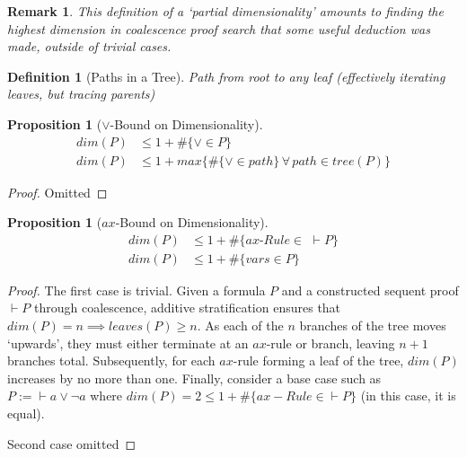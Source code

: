 \documentclass{article}
\def\seteq{:=}
\theoremstyle{indented}
\newtheorem{definition}[sec-ctr]{Definition}
\newtheorem{proposition}[sec-ctr]{Proposition}
\newtheorem*{remark*}{Remark}
\begin{document}
        \begin{remark*}
            This definition of a `partial dimensionality' amounts to finding the highest dimension in coalescence proof search that some useful deduction was made, outside of trivial cases.
        \end{remark*}


        \begin{definition}[Paths in a Tree]
            Path from root to any leaf (effectively iterating leaves, but tracing parents)
        \end{definition}


        \begin{proposition}[$\vee$-Bound on Dimensionality]
            \begin{align*}
                dim(P) &\leq 1 + \#\{\vee \in P\} \\
                dim(P) &\leq 1 + max\{\#\{\vee \in path\} \, \forall \, path \in tree(P)\}
            \end{align*}
        \end{proposition}

        \begin{proof}
            Omitted
        \end{proof}


        \begin{proposition}[$ax$-Bound on Dimensionality]
            \begin{align*}
                dim(P) &\leq 1 + \#\{ax\textit{-Rule} \in \,\, \vdash P\} \\
                dim(P) &\leq 1 + \#\{vars \in P\}
            \end{align*}
        \end{proposition}

        \begin{proof}
            The first case is trivial.
            Given a formula $P$ and a constructed sequent proof $\vdash P$ through coalescence, additive stratification ensures that $dim(P) = n \implies leaves(P) \geq n$.
            As each of the $n$ branches of the tree moves `upwards', they must either terminate at an $ax$-rule or branch, leaving $n + 1$ branches total.
            Subsequently, for each $ax$-rule forming a leaf of the tree, $dim(P)$ increases by no more than one.
            Finally, consider a base case such as $P \seteq \vdash a \vee \neg a$ where $dim(P) = 2 \leq 1 + \#\{ax-Rule \in \vdash P\}$ (in this case, it is equal).
            
            Second case omitted
        \end{proof}

    
\end{document}
